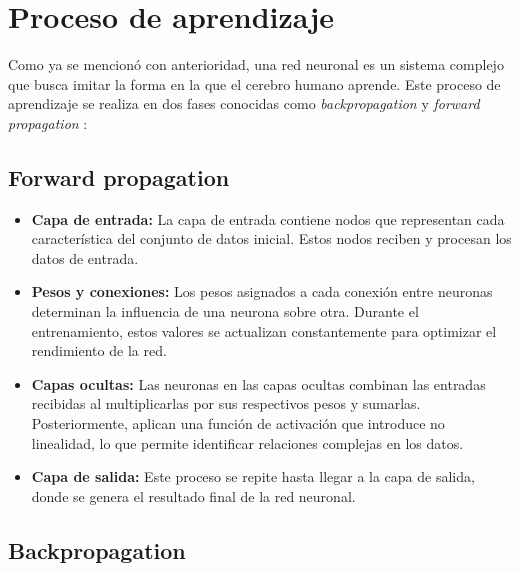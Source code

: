 \section{Proceso de aprendizaje}
Como ya se mencionó con anterioridad, una red neuronal es un sistema complejo que busca imitar la forma en la que el cerebro humano aprende.
Este proceso de aprendizaje se realiza en dos fases conocidas como \textit{backpropagation} y \textit{forward propagation} \cite{L12}:


\subsection{Forward propagation}

\begin{itemize}
	\item \textbf{Capa de entrada:} La capa de entrada contiene nodos que representan cada característica del conjunto de datos inicial. Estos nodos reciben y procesan los datos de entrada.  
	\item \textbf{Pesos y conexiones:} Los pesos asignados a cada conexión entre neuronas determinan la influencia de una neurona sobre otra. Durante el entrenamiento, estos valores se actualizan constantemente para optimizar el rendimiento de la red.  
	\item \textbf{Capas ocultas:} Las neuronas en las capas ocultas combinan las entradas recibidas al multiplicarlas por sus respectivos pesos y sumarlas. Posteriormente, aplican una función de activación que introduce no linealidad, lo que permite identificar relaciones complejas en los datos.  
	\item \textbf{Capa de salida:} Este proceso se repite hasta llegar a la capa de salida, donde se genera el resultado final de la red neuronal.
\end{itemize}



\subsection{Backpropagation}

